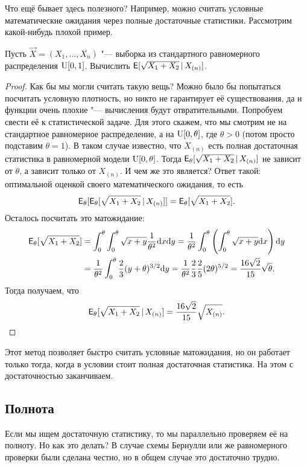 Что ещё бывает здесь полезного? Например, можно считать условные математические ожидания через полные достаточные статистики. Рассмотрим какой-нибудь плохой пример.
\begin{problem}
	Пусть $\vec{X} = (X_{1}, \ldots, X_{n})$ "--- выборка из стандартного равномерного распределения $\mathrm{U}[0, 1]$. Вычислить $\operatorname{\mathsf{E}}[\sqrt{X_{1} + X_{2}}\,|\,X_{(n)}]$.
\end{problem}
\begin{proof}
	Как бы мы могли считать такую вещь? Можно было бы попытаться посчитать условную плотность, но никто не гарантирует её существования, да и функции очень плохие "--- вычисления будут отвратительными. Попробуем свести её к статистической задаче. Для этого скажем, что мы смотрим не на стандартное равномерное распределение, а на $\mathrm{U}[0, \theta]$, где $\theta > 0$ (потом просто подставим $\theta = 1$). В таком случае известно, что $X_{(n)}$ есть полная достаточная статистика в равномерной модели $\mathrm{U}[0, \theta]$. Тогда $\operatorname{\mathsf{E}}_{\theta}[\sqrt{X_{1} + X_{2}}\,|\,X_{(n)}]$ не зависит от $\theta$, а зависит только от $X_{(n)}$. И чем же это является? Ответ такой: оптимальной оценкой своего математического ожидания, то есть
	\[
		\operatorname{\mathsf{E}}_{\theta}[\operatorname{\mathsf{E}}_{\theta}[\sqrt{X_{1} + X_{2}}\,|\,X_{(n)}]]
		= \operatorname{\mathsf{E}}_{\theta}[\sqrt{X_{1} + X_{2}}].
	\]
	Осталось посчитать это матожидание:
	\begin{align*}
		\operatorname{\mathsf{E}}_{\theta}[\sqrt{X_{1} + X_{2}}]
		&= \int_{0}^{\theta}\int_{0}^{\theta} \sqrt{x + y}\frac{1}{\theta^{2}}\dd x \dd y
		= \frac{1}{\theta^{2}}\int_{0}^{\theta}\left(\int_{0}^{\theta} \sqrt{x + y}\dd x\right)\dd y \\
		&= \frac{1}{\theta^{2}}\int_{0}^{\theta} \frac{2}{3}(y + \theta)^{3/2}\dd y
		= \frac{1}{\theta^{2}}\frac{2}{3}\frac{2}{5}(2\theta)^{5/2}
		= \frac{16\sqrt{2}}{15}\sqrt{\theta}.
	\end{align*}
	Тогда получаем, что
	\[
		\operatorname{\mathsf{E}}_{\theta}[\sqrt{X_{1} + X_{2}}\,|\,X_{(n)}]
		= \frac{16\sqrt{2}}{15}\sqrt{X_{(n)}}. \qedhere
	\]
\end{proof}

Этот метод позволяет быстро считать условные матожидания, но он работает только тогда, когда в условии стоит полная достаточная статистика. На этом с достаточностью заканчиваем.

\subsection{Полнота}
Если мы ищем достаточную статистику, то мы параллельно проверяем её на полноту. Но как это делать? В случае схемы Бернулли или же равномерного проверки были сделана честно, но в общем случае это достаточно трудно.

